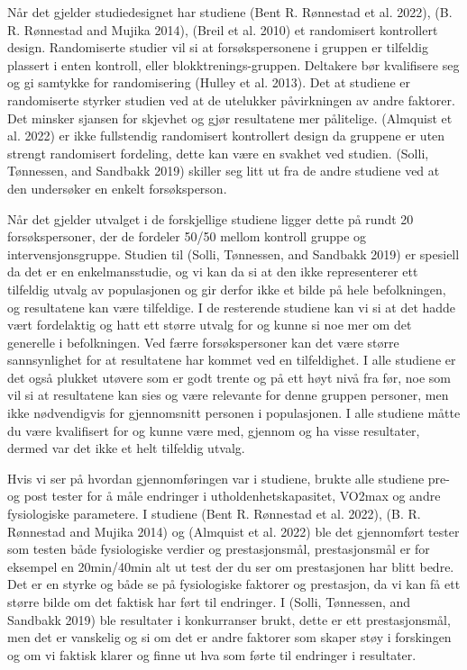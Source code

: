 \documentclass[
  letterpaper,
  DIV=11,
  numbers=noendperiod]{scrreprt}
\begin{document}
Når det gjelder studiedesignet har studiene (Bent R. Rønnestad et al.
2022), (B. R. Rønnestad and Mujika 2014), (Breil et al. 2010) et
randomisert kontrollert design. Randomiserte studier vil si at
forsøkspersonene i gruppen er tilfeldig plassert i enten kontroll, eller
blokktrenings-gruppen. Deltakere bør kvalifisere seg og gi samtykke for
randomisering (Hulley et al. 2013). Det at studiene er randomiserte
styrker studien ved at de utelukker påvirkningen av andre faktorer. Det
minsker sjansen for skjevhet og gjør resultatene mer pålitelige.
(Almquist et al. 2022) er ikke fullstendig randomisert kontrollert
design da gruppene er uten strengt randomisert fordeling, dette kan være
en svakhet ved studien. (Solli, Tønnessen, and Sandbakk 2019) skiller
seg litt ut fra de andre studiene ved at den undersøker en enkelt
forsøksperson.

Når det gjelder utvalget i de forskjellige studiene ligger dette på
rundt 20 forsøkspersoner, der de fordeler 50/50 mellom kontroll gruppe
og intervensjonsgruppe. Studien til (Solli, Tønnessen, and Sandbakk
2019) er spesiell da det er en enkelmansstudie, og vi kan da si at den
ikke representerer ett tilfeldig utvalg av populasjonen og gir derfor
ikke et bilde på hele befolkningen, og resultatene kan være tilfeldige.
I de resterende studiene kan vi si at det hadde vært fordelaktig og hatt
ett større utvalg for og kunne si noe mer om det generelle i
befolkningen. Ved færre forsøkspersoner kan det være større
sannsynlighet for at resultatene har kommet ved en tilfeldighet. I alle
studiene er det også plukket utøvere som er godt trente og på ett høyt
nivå fra før, noe som vil si at resultatene kan sies og være relevante
for denne gruppen personer, men ikke nødvendigvis for gjennomsnitt
personen i populasjonen. I alle studiene måtte du være kvalifisert for
og kunne være med, gjennom og ha visse resultater, dermed var det ikke
et helt tilfeldig utvalg.

Hvis vi ser på hvordan gjennomføringen var i studiene, brukte alle
studiene pre- og post tester for å måle endringer i
utholdenhetskapasitet, VO2max og andre fysiologiske parametere. I
studiene (Bent R. Rønnestad et al. 2022), (B. R. Rønnestad and Mujika
2014) og (Almquist et al. 2022) ble det gjennomført tester som testen
både fysiologiske verdier og prestasjonsmål, prestasjonsmål er for
eksempel en 20min/40min alt ut test der du ser om prestasjonen har blitt
bedre. Det er en styrke og både se på fysiologiske faktorer og
prestasjon, da vi kan få ett større bilde om det faktisk har ført til
endringer. I (Solli, Tønnessen, and Sandbakk 2019) ble resultater i
konkurranser brukt, dette er ett prestasjonsmål, men det er vanskelig og
si om det er andre faktorer som skaper støy i forskingen og om vi
faktisk klarer og finne ut hva som førte til endringer i resultater.
\end{document}
